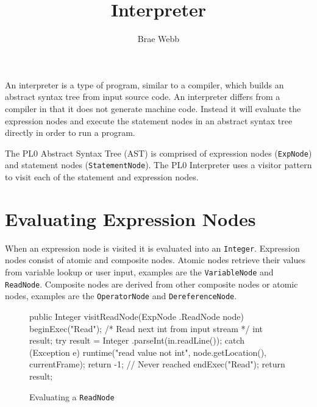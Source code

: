 \documentclass[a4paper,twoside,twocolumn]{article}
\begin{document}
\thispagestyle{empty}
\title{\vspace*{-3cm}Interpreter}
\author{Brae Webb}
\maketitle
\pagestyle{myheadings}
\vspace*{-4ex}

An interpreter is a type of program, similar to a compiler, which builds an
abstract syntax tree from input source code. An interpreter differs from a
compiler in that it does not generate machine code. Instead it will evaluate
the expression nodes and execute the statement nodes in an abstract syntax tree
directly in order to run a program.


The PL0 Abstract Syntax Tree (AST) is comprised of expression nodes
(\texttt{ExpNode}) and statement nodes (\texttt{StatementNode}). The PL0
Interpreter uses a visitor pattern to visit each of the statement and expression
nodes.

\section{Evaluating Expression Nodes}\label{section:expressions}
When an expression node is visited it is evaluated into an \texttt{Integer}.
Expression nodes consist of atomic and composite nodes. Atomic nodes retrieve
their values from variable lookup or user input, examples are the 
\texttt{VariableNode} and \texttt{ReadNode}. Composite nodes are derived from
other composite nodes or atomic nodes, examples are the \texttt{OperatorNode}
and \texttt{DereferenceNode}.


\begin{figure}[H]
\begin{java}
public Integer visitReadNode(ExpNode
        .ReadNode node) {
    beginExec("Read");
    /* Read next int from input stream */
    int result;
    try {
        result = Integer
                .parseInt(in.readLine());
    } catch (Exception e) {
        runtime("read value not int",
                node.getLocation(),
                currentFrame);
        return -1; // Never reached
    }
    endExec("Read");
    return result;
}
\end{java}
\caption{Evaluating a \texttt{ReadNode}}\label{figure:readnode}
\end{figure}
\end{document}
